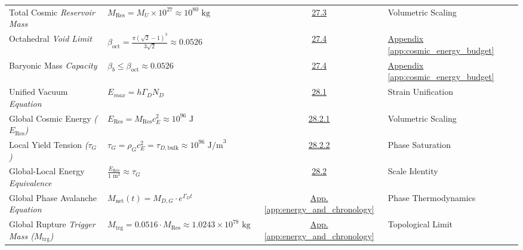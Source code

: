 \begin{longtable}{@{} p{4.5cm} p{6cm} c p{4cm} @{}}
Total Cosmic \newline \textit{Reservoir Mass} & $M_{\text{Res}} = M_U \times 10^{27} \approx 10^{80} \text{ kg}$ & \hyperref[sec:27.3]{27.3} & Volumetric Scaling \\

Octahedral \newline \textit{Void Limit} & $\beta_{\text{oct}} = \frac{\pi(\sqrt{2}-1)^3}{3\sqrt{2}} \approx 0.0526$ & \hyperref[sec:27.4]{27.4} & \hyperref[app:cosmic_energy_budget]{Appendix \ref*{app:cosmic_energy_budget}} \\

Baryonic Mass \newline \textit{Capacity} & $\beta_b \le \beta_{\text{oct}} \approx 0.0526$ & \hyperref[sec:27.4]{27.4} & \hyperref[app:cosmic_energy_budget]{Appendix \ref*{app:cosmic_energy_budget}} \\

Unified Vacuum \newline \textit{Equation} & $E_{max} = h \Gamma_D N_D$ & \hyperref[sec:28.1]{28.1} & Strain Unification \\

Global Cosmic Energy \newline \textit{($E_{\text{Res}}$)} & $E_{\text{Res}} = M_{\text{Res}} c_E^2 \approx 10^{96} \text{ J}$ & \hyperref[sec:28.2.1]{28.2.1} & Volumetric Scaling \\

Local Yield Tension \newline \textit{($\tau_G$)} & $\tau_G = \rho_G c_E^2 = \tau_{D,\text{bulk}} \approx 10^{96} \text{ J/m}^3$ & \hyperref[sec:28.2.2]{28.2.2} & Phase Saturation \\

Global-Local Energy \newline \textit{Equivalence} & $\frac{E_{\text{Res}}}{1 \text{ m}^3} \approx \tau_G$ & \hyperref[sec:28.2]{28.2} & Scale Identity \\

Global Phase Avalanche \newline \textit{Equation} & $M_{\text{net}}(t) = M_{D,G} \cdot e^{\Gamma_D t}$ & \hyperref[app:energy_and_chronology]{App. \ref*{app:energy_and_chronology}} & Phase Thermodynamics \\

Global Rupture \newline \textit{Trigger Mass ($M_{\text{trg}}$)} & $M_{\text{trg}} = 0.0516 \cdot M_{\text{Res}} \approx 1.0243 \times 10^{78} \text{ kg}$ & \hyperref[app:energy_and_chronology]{App. \ref*{app:energy_and_chronology}} & Topological Limit \\


\end{longtable}
